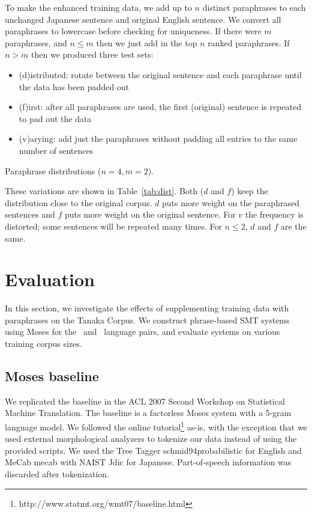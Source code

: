 \documentclass[english]{jnlp_1.4}
\newcommand{\citep}{}
\newcommand{\JE}{}
\newcommand{\EJ}{}
\begin{document}
To make the enhanced training data, we add up to $n$ distinct
paraphrases to each unchanged Japanese sentence and original English
sentence. We convert all paraphrases to lowercase before checking for
uniqueness. If there were $m$ paraphrases, and $n \le m$ then we just
add in the top $n$ ranked paraphrases. If $n > m$ then we produced
three test sets:

\begin{itemize}
\item (d)istributed: rotate between the original sentence and each
  paraphrase until the data has been padded out
\item (f)irst: after all paraphrases are used, the first
  (original) sentence is repeated to pad out the data
\item (v)arying: add just the paraphrases without padding all entries to the same number of sentences
\end{itemize} 


\begin{table}[t]
  \caption{Paraphrase distributions ($n = 4, m = 2$).}
    \label{tab:dist}

\end{table}

These variations are shown in Table~\ref{tab:dist}. Both ($d$ and $f$)
keep the distribution close to the original corpus. $d$ puts more
weight on the paraphrased sentences and $f$ puts more weight on the
original sentence. For $v$ the frequency is distorted; some sentences
will be repeated many times. For $n \le 2$, $d$ and $f$ are the same.



\section{Evaluation}
\label{sec:eval}

In this section, we investigate the effects of supplementing training
data with paraphrases on the Tanaka Corpus. We construct phrase-based
SMT systems using Moses for the 
\linebreak
\EJ~and \JE~language pairs, and evaluate
systems on various training corpus sizes.


\subsection{Moses baseline}

We replicated the baseline in the ACL 2007 Second Workshop on
Statistical Machine Translation. The baseline is a factorless Moses
system with a 5-gram language model. We followed the online
    tutorial\footnote{http://www.statmt.org/wmt07/baseline.html} as-is,
with the exception that we used external morphological analyzers to
tokenize our data instead of using the provided scripts. We used the
Tree Tagger \citep{schmid94probabilistic} for English and MeCab
\citep{mecab} with NAIST Jdic for Japanese. Part-of-speech information
was discarded after tokenization.
\end{document}
